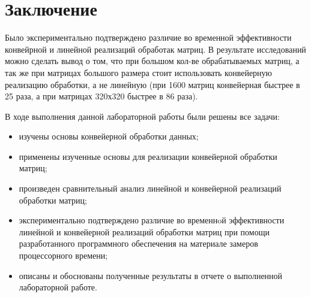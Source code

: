 \chapter*{Заключение}

Было экспериментально подтверждено различие во временной эффективности конвейрной и линейной реализаций обработак матриц. В результате исследований можно сделать вывод о том, что при большом кол-ве обрабатываемых матриц, а так же при матрицах большого размера стоит использовать конвейерную реализацию обработки, а не линейную (при 1600 матриц конвейерная быстрее в 25 раза, а при матрицах 320х320 быстрее в 86 раза).

\vspace{5mm}

В ходе выполнения данной лабораторной работы были решены все задачи:
\begin{itemize}[label=---]
	\item изучены основы конвейерной обработки данных;
	\item применены изученные основы для реализации конвейерной обработки матриц;
	\item произведен сравнительный анализ линейной и конвейерной реализаций обработки матриц;
	\item экспериментально подтверждено различие во временнoй эффективности линейной и конвейерной реализаций обработки матриц при помощи разработанного программного обеспечения на материале замеров процессорного времени;
	\item описаны и обоснованы полученные результаты в отчете о выполненной лабораторной работе.
\end{itemize}